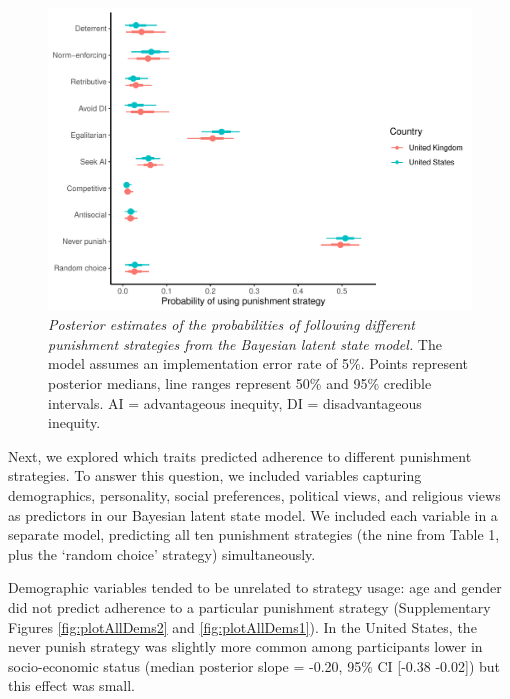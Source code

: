 \documentclass[
  man,floatsintext]{apa6}
\begin{document}
\begin{figure}
\centering
\includegraphics{manuscript_files/figure-latex/plotModel1b-1.pdf}
\caption{\label{fig:plotModel1b}\emph{Posterior estimates of the probabilities of following
different punishment strategies from the Bayesian latent state model.} The model
assumes an implementation error rate of 5\%. Points represent posterior medians,
line ranges represent 50\% and 95\% credible intervals. AI = advantageous
inequity, DI = disadvantageous inequity.}
\end{figure}

Next, we explored which traits predicted adherence to different punishment
strategies. To answer this question, we included variables capturing
demographics, personality, social preferences, political views, and religious
views as predictors in our Bayesian latent state model. We included each
variable in a separate model, predicting all ten punishment strategies
(the nine from Table 1, plus the `random choice' strategy) simultaneously.

Demographic variables tended to be unrelated to strategy usage: age and gender
did not predict adherence to a particular punishment strategy (Supplementary
Figures \ref{fig:plotAllDems2} and \ref{fig:plotAllDems1}). In the United
States, the never punish strategy was slightly more common among participants
lower in socio-economic status (median posterior slope =
-0.20, 95\% CI {[}-0.38
-0.02{]}) but this effect was small.
\end{document}

